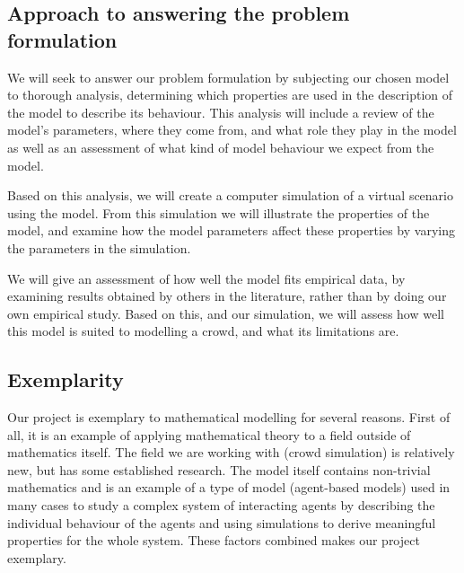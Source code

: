 \subsection{Approach to answering the problem formulation}
We will seek to answer our problem formulation by subjecting our chosen model 
to thorough analysis, determining which properties are used in the description 
of the model to describe its behaviour. This analysis will include a review of 
the model's parameters, where they come from, and what role they play in the 
model as well as an assessment of what kind of model behaviour we expect from 
the model.

Based on this analysis, we will create a computer simulation of a virtual 
scenario using the model. From this simulation we will illustrate the 
properties of the model, and examine how the model parameters affect these 
properties by varying the parameters in the simulation.


We will give an assessment of how well the model fits empirical data, by 
examining results obtained by others in the literature, rather than by doing 
our own empirical study. Based on this, and our simulation, we will assess how 
well this model is suited to modelling a crowd, and what its limitations are.

\subsection{Exemplarity}
Our project is exemplary to mathematical modelling for several reasons. First 
of all, it is an example of applying mathematical theory to a field outside of 
mathematics itself. The field we are working with (crowd simulation) is 
relatively new, but has some established research. The model itself contains 
non-trivial mathematics and is an example of a type of model (agent-based 
models) used in many cases to study a complex system of interacting agents by 
describing the individual behaviour of the agents and using simulations to 
derive meaningful properties for the whole system. These factors combined 
makes our project exemplary.


